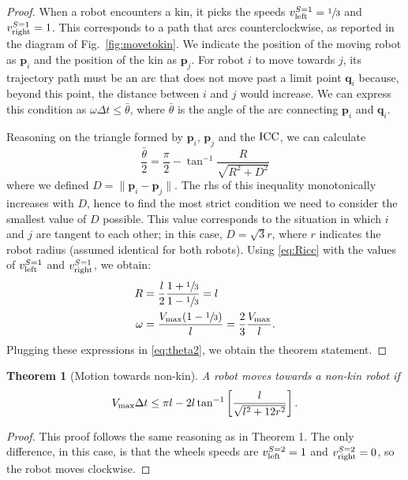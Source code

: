 \documentclass[conference]{IEEEtran}
\newtheorem{theorem}{Theorem}
\renewcommand{\vec}[1]{\ensuremath{\mathbf{#1}}}
\begin{document}
\begin{proof}
  When a robot encounters a kin, it picks the speeds
  $v_{\text{left}}^{S=1} = \sfrac{1}{3}$ and $v_{\text{right}}^{S=1} = 1$. This corresponds to a
  path that arcs counterclockwise, as reported in the diagram of
  Fig.~\ref{fig:movetokin}. We indicate the position of the moving robot as
  $\vec{p}_i$ and the position of the kin as $\vec{p}_j$. For robot $i$ to move
  towards $j$, its trajectory path must be an arc that does not move past a
  limit point $\vec{q}_i$ because, beyond this point, the distance between $i$
  and $j$ would increase. We can express this condition as
  $\omega\Delta t\le \bar{\theta}$, where $\bar{\theta}$ is the angle of the arc
  connecting $\vec{p}_i$ and $\vec{q}_i$.

  Reasoning on the triangle formed by $\vec{p}_i$, $\vec{p}_j$ and the $\text{ICC}$,
  we can calculate
  \begin{equation}
    \label{eq:theta2}
    \frac{\bar{\theta}}{2} = \frac{\pi}{2} - \tan^{-1}\frac{R}{\sqrt{R^2+D^2}}
  \end{equation}
  where we defined $D = \lVert\vec{p}_i - \vec{p}_j\rVert$. The rhs of this
  inequality monotonically increases with $D$, hence to find the most strict
  condition we need to consider the smallest value of $D$ possible. This value
  corresponds to the situation in which $i$ and $j$ are tangent to each other;
  in this case, $D=\sqrt{3}r$, where $r$ indicates the robot radius (assumed
  identical for both robots). Using \eqref{eq:Ricc} with the values of
  $v_{\text{left}}^{S=1}$ and $v_{\text{right}}^{S=1}$, we obtain:
  \begin{align*}
    R &= \frac{l}{2}\frac{1+\sfrac{1}{3}}{1-\sfrac{1}{3}} = l\\
    \omega &= \frac{V_{\text{max}}(1-\sfrac{1}{3})}{l} = \frac{2}{3}\frac{V_{\text{max}}}{l}.
  \end{align*}
  Plugging these expressions in \eqref{eq:theta2}, we obtain the theorem
  statement.
\end{proof}

\begin{theorem}[Motion towards non-kin]
  A robot moves towards a non-kin robot if
  \begin{equation}
    \label{eq:movetononkin}
    \VM\Delta t \le \pi l - 2l\tan^{-1}\left[\frac{l}{\sqrt{l^2+12r^2}}\right].
  \end{equation}
\end{theorem}
\begin{proof}
  This proof follows the same reasoning as in Theorem 1. The only difference, in
  this case, is that the wheels speeds are $v_{\text{left}}^{S=2} = 1$ and
  $v_{\text{right}}^{S=2} = 0$, so the robot moves clockwise.
\end{proof}
\end{document}
